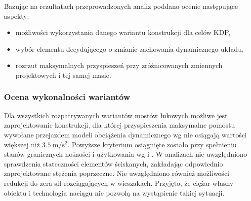 Bazując na rezultatach przeprowadzonych analiz poddano ocenie następujące aspekty:
\begin{itemize}
\item możliwości wykorzystania danego wariantu konstrukcji dla celów KDP,
\item wybór elementu decydującego o zmianie zachowania dynamicznego układu,
\item rozrzut maksymalnych przyspieszeń przy zróżnicowanych zmiennych projektowych i tej samej masie.
\end{itemize}

\subsubsection{Ocena wykonalności wariantów}
Dla wszystkich rozpatrywanych wariantów mostów łukowych możliwe jest zaprojektowanie konstrukcji, dla której przyspieszenia maksymalne pomostu wywołane przejazdem modeli obciążenia dynamicznego wg \cite{PKNj} nie osiągają wartości większej niż $3.5\;\mathrm{m/s^2}$. Powyższe kryterium osiągnięte zostało przy spełnieniu stanów granicznych nośności i użytkowania wg \cite{PKNc} i \cite{PKNj}. W analizach nie uwzględniono sprawdzenia stateczności elementów ściskanych, zakładając odpowiednio zaprojektowane stężenia poprzeczne. Nie uwzględniono również możliwości redukcji do zera sił rozciągających w wieszakach. Przyjęto, że ciężar własny obiektu i technologia naciągu nie pozwolą na wystąpienie takiej sytuacji.

